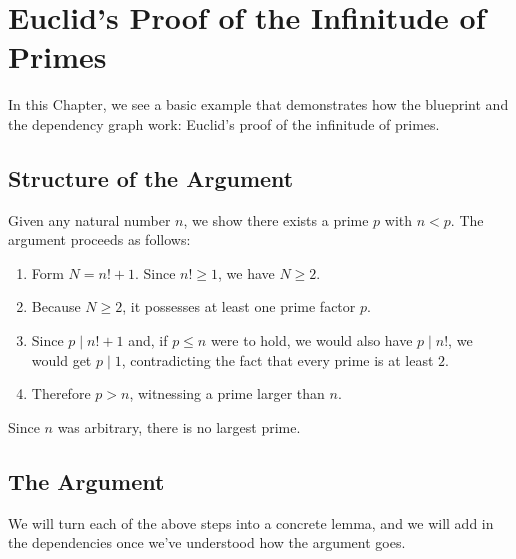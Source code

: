 %

\chapter{Euclid's Proof of the Infinitude of Primes}

In this Chapter, we see a basic example that demonstrates how the blueprint and the dependency graph work: Euclid's proof of the infinitude of primes.

\section{Structure of the Argument}

Given any natural number $n$, we show there exists a prime $p$ with $n < p$.
The argument proceeds as follows:

\begin{enumerate}
  \item Form $N = n! + 1$. Since $n! ≥ 1$, we have $N ≥ 2$.
  \item Because $N ≥ 2$, it possesses at least one prime factor $p$.
  \item Since $p \mid n! + 1$ and, if $p ≤ n$ were to hold, we would also have $p \mid n!$, we would get $p ∣ 1$, contradicting the fact that every prime is at least $2$.
  \item Therefore $p > n$, witnessing a prime larger than $n$.
\end{enumerate}

Since $n$ was arbitrary, there is no largest prime.

\section{The Argument}

We will turn each of the above steps into a concrete lemma, and we will add in the dependencies once we've understood how the argument goes.

